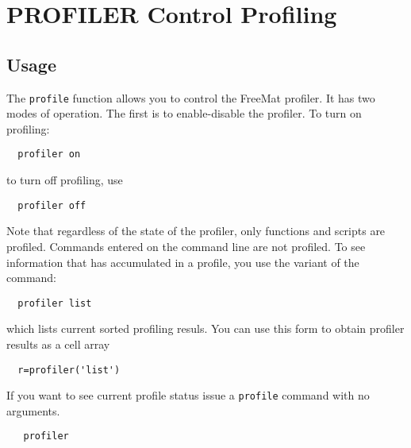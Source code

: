 \section{PROFILER Control Profiling}

\subsection{Usage}

The \verb|profile| function allows you to control the FreeMat profiler.
It has two modes of operation.  The first is to enable-disable
the profiler.  To turn on profiling:
\begin{verbatim}
  profiler on
\end{verbatim}
to turn off profiling, use
\begin{verbatim}
  profiler off
\end{verbatim}
Note that regardless of the state of the profiler, only functions
and scripts are profiled.  Commands entered on the command line
are not profiled.  To see information that has accumulated in a
profile, you use the variant of the command:
\begin{verbatim}
  profiler list
\end{verbatim}
which lists current sorted profiling resuls. You can use this form to obtain 
profiler results as a cell array
\begin{verbatim}
  r=profiler('list')
\end{verbatim}
If you want to see current profile
status issue a \verb|profile| command with no arguments.
\begin{verbatim}
   profiler
\end{verbatim}
